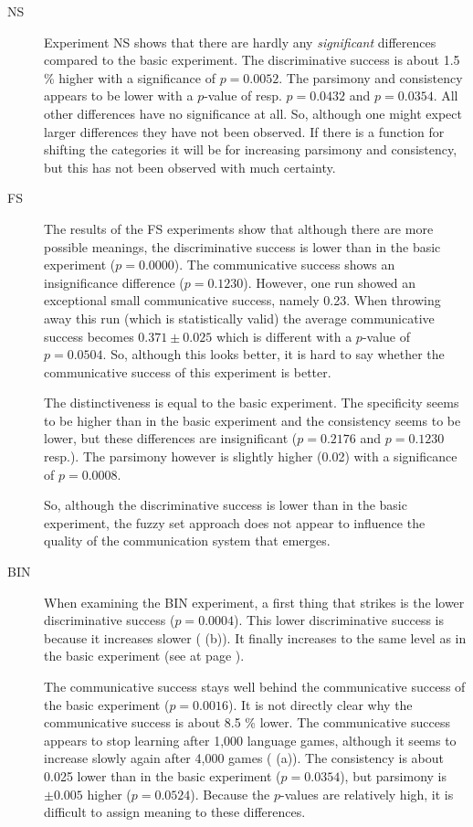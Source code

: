 \begin{description}
\item[NS] Experiment NS shows that there are hardly any {\em significant} differences compared to the basic experiment. The discriminative success is about 1.5 \% higher with a significance of $p=0.0052$. The parsimony and consistency appears to be lower with a $p$-value of resp. $p=0.0432$ and $p=0.0354$. All other differences have no significance at all. So, although one might expect larger differences they have not been observed. If there is a function for shifting the categories it will be for increasing parsimony and consistency, but this has not been observed with much certainty.

\item[FS] The results of the FS experiments show that although there are more possible meanings, the discriminative success is lower than in the basic experiment ($p=0.0000$). The communicative success shows an insignificance difference ($p=0.1230$). However,  one run showed an exceptional small communicative success, namely 0.23. When throwing away this run (which is statistically valid) the average communicative success becomes $0.371 \pm 0.025$ which is different with a $p$-value of $p=0.0504$. So, although this looks better, it is hard to say whether the communicative success of this experiment is better. 

The distinctiveness is equal to the basic experiment. The specificity seems to be higher than in the basic experiment and the consistency seems to be lower, but these differences are insignificant ($p=0.2176$ and $p=0.1230$ resp.). The parsimony however is slightly higher (0.02) with a significance of $p=0.0008$.

So, although the discriminative success is lower than in the basic experiment, the fuzzy set approach does not appear to influence the quality of the communication system that emerges. 

\item[BIN] When examining the BIN experiment, a first thing that strikes is the lower discriminative success ($p=0.0004$). This lower discriminative success is because it increases slower ( (b)). It finally increases to the same level as in the basic experiment (see  at page \pageref{f:st:plot}).

The communicative success stays well behind the communicative success of the basic experiment ($p=0.0016$). It is not directly clear why the communicative success is about 8.5 \% lower. The communicative success appears to stop learning after 1,000 language games, although it seems to increase slowly again after 4,000 games ( (a)). The consistency is about 0.025 lower than in the basic experiment ($p=0.0354$), but parsimony is $\pm 0.005$ higher ($p=0.0524$). Because the $p$-values are relatively high, it is difficult to assign meaning to these differences.


\end{description}
